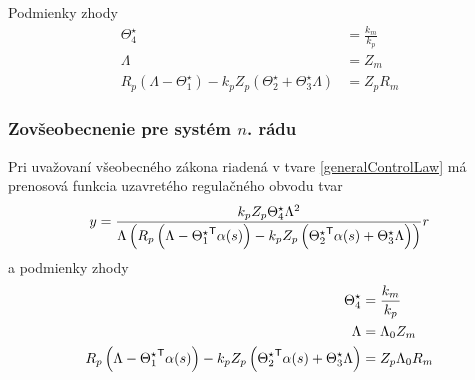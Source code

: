 \documentclass[a4paper, 10pt, ]{article}
\begin{document}
Podmienky zhody
\begin{subequations}
	\begin{align}
		\Theta_4^\star &= \frac{k_m}{k_p} \label{idealTheta4_02} \\
		\Lambda &= Z_m  \label{lambda_02}\\
		R_p \left( \Lambda - \Theta_1^\star \right) - k_p Z_p \left( \Theta_2^\star + \Theta_3^\star\Lambda \right)
		&=
		Z_p R_m
	\end{align}
\end{subequations}


















\subsubsection{Zovšeobecnenie pre systém $n$. rádu}


Pri uvažovaní všeobecného zákona riadená v tvare \eqref{generalControlLaw} má prenosová funkcia uzavretého regulačného obvodu tvar
\begin{equation}
	y
	=
	\frac{
		k_p
		Z_p
		\Theta_4^\star
		\Lambda^2
		}{
		\Lambda
		\left(
			R_p
			\left(
				\Lambda - {\Theta_1^\star}^{\mathsf{T}}	\alpha(s)
			\right)
			-
			k_p
			Z_p
			\left(
				{\Theta_2^\star}^{\mathsf{T}}	\alpha(s)
				+
				\Theta_3^\star \Lambda
			\right)
		\right)}
	r
\end{equation}
a podmienky zhody
\begin{subequations}
	\begin{align}
		\Theta_4^\star &= \frac{k_m}{k_p} \label{idealTheta4_03} \\
		\Lambda &= \Lambda_0 Z_m \label{lambda_03} \\
		R_p
		\left(
			\Lambda - {\Theta_1^\star}^{\mathsf{T}} \alpha(s)
		\right)
		-
		k_p
		Z_p
		\left(
			{\Theta_2^\star}^{\mathsf{T}} \alpha(s)
			+
			\Theta_3^\star \Lambda
		\right)
	    &=
	    Z_p
	    \Lambda_0
	    R_m
	\end{align}
\end{subequations}
\end{document}
